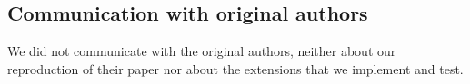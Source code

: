 

\subsection{Communication with original authors}
We did not communicate with the original authors, neither about our reproduction of their paper nor about the extensions that we implement and test.

